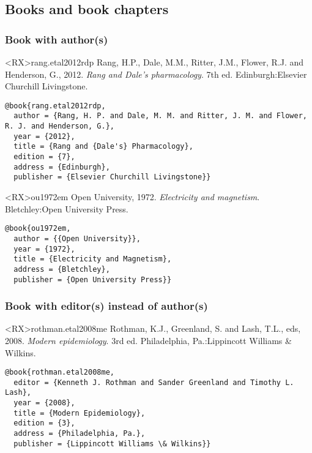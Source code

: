 \documentclass[10pt,a4paper]{article}
\begin{document}
\subsection{Books and book chapters}

\subsubsection*{Book with author(s)}

\begin{bibexbox}<RX>{rang.etal2012rdp}
  Rang, H.P., Dale, M.M., Ritter, J.M., Flower, R.J. and Henderson, G., 2012. \emph{Rang and Dale's pharmacology}. 7th ed. Edinburgh:\@ Elsevier Churchill Livingstone.
  \tcblower
\begin{Verbatim}
@book{rang.etal2012rdp,
  author = {Rang, H. P. and Dale, M. M. and Ritter, J. M. and Flower, R. J. and Henderson, G.},
  year = {2012},
  title = {Rang and {Dale's} Pharmacology},
  edition = {7},
  address = {Edinburgh},
  publisher = {Elsevier Churchill Livingstone}}
\end{Verbatim}
\end{bibexbox}

\begin{bibexbox}<RX>{ou1972em}
  Open University, 1972. \emph{Electricity and magnetism}. Bletchley:\@ Open University Press.
  \tcblower
\begin{Verbatim}
@book{ou1972em,
  author = {{Open University}},
  year = {1972},
  title = {Electricity and Magnetism},
  address = {Bletchley},
  publisher = {Open University Press}}
\end{Verbatim}
\end{bibexbox}

\subsubsection*{Book with editor(s) instead of author(s)}

\begin{bibexbox}<RX>{rothman.etal2008me}
  Rothman, K.J., Greenland, S. and Lash, T.L., eds, 2008. \emph{Modern epidemiology}. 3rd ed. Philadelphia, Pa.:\@ Lippincott Williams \& Wilkins.
  \tcblower
\begin{Verbatim}
@book{rothman.etal2008me,
  editor = {Kenneth J. Rothman and Sander Greenland and Timothy L. Lash},
  year = {2008},
  title = {Modern Epidemiology},
  edition = {3},
  address = {Philadelphia, Pa.},
  publisher = {Lippincott Williams \& Wilkins}}
\end{Verbatim}
\end{bibexbox}
\end{document}
